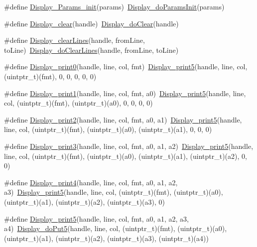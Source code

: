 \begin{DoxyCompactItemize}
\item 
\#define \hyperlink{_display_8h_a4fb2982f52995a80194fbb107883a183}{Display\+\_\+\+Params\+\_\+init}(params)~\hyperlink{_display_8h_aff22833ae1cdccbbde3a57e82f85896c}{Display\+\_\+do\+Params\+Init}(params)
\item 
\#define \hyperlink{_display_8h_ab5a031704e2a1a9525d2c1a92346f842}{Display\+\_\+clear}(handle)~\hyperlink{_display_8h_a68955bb81b0db818bf2688695dca1e4a}{Display\+\_\+do\+Clear}(handle)
\item 
\#define \hyperlink{_display_8h_abae2ae910c2c533dbf11d24c656609d1}{Display\+\_\+clear\+Lines}(handle,  from\+Line,  to\+Line)~\hyperlink{_display_8h_a443fc3167f9ce70bebf9e016443c6383}{Display\+\_\+do\+Clear\+Lines}(handle, from\+Line, to\+Line)
\item 
\#define \hyperlink{_display_8h_acd3685718132aa56f51827b28cab9717}{Display\+\_\+print0}(handle,  line,  col,  fmt)~\hyperlink{_display_8h_a9c5ad419aa15ab0f127aec0e81a4706a}{Display\+\_\+print5}(handle, line, col, (uintptr\+\_\+t)(fmt), 0, 0, 0, 0, 0)
\item 
\#define \hyperlink{_display_8h_a32faeb481b205f15a47fe8a57b15050c}{Display\+\_\+print1}(handle,  line,  col,  fmt,  a0)~\hyperlink{_display_8h_a9c5ad419aa15ab0f127aec0e81a4706a}{Display\+\_\+print5}(handle, line, col, (uintptr\+\_\+t)(fmt), (uintptr\+\_\+t)(a0), 0, 0, 0, 0)
\item 
\#define \hyperlink{_display_8h_a38c04b221312d6810860cc798c5bd87a}{Display\+\_\+print2}(handle,  line,  col,  fmt,  a0,  a1)~\hyperlink{_display_8h_a9c5ad419aa15ab0f127aec0e81a4706a}{Display\+\_\+print5}(handle, line, col, (uintptr\+\_\+t)(fmt), (uintptr\+\_\+t)(a0), (uintptr\+\_\+t)(a1), 0, 0, 0)
\item 
\#define \hyperlink{_display_8h_ac4666e03680fc5c36ba2d186fce9f8f1}{Display\+\_\+print3}(handle,  line,  col,  fmt,  a0,  a1,  a2)~\hyperlink{_display_8h_a9c5ad419aa15ab0f127aec0e81a4706a}{Display\+\_\+print5}(handle, line, col, (uintptr\+\_\+t)(fmt), (uintptr\+\_\+t)(a0), (uintptr\+\_\+t)(a1), (uintptr\+\_\+t)(a2), 0, 0)
\item 
\#define \hyperlink{_display_8h_a346f79ffd49fb4b049812cff58e1c55b}{Display\+\_\+print4}(handle,  line,  col,  fmt,  a0,  a1,  a2,  a3)~\hyperlink{_display_8h_a9c5ad419aa15ab0f127aec0e81a4706a}{Display\+\_\+print5}(handle, line, col, (uintptr\+\_\+t)(fmt), (uintptr\+\_\+t)(a0), (uintptr\+\_\+t)(a1), (uintptr\+\_\+t)(a2), (uintptr\+\_\+t)(a3), 0)
\item 
\#define \hyperlink{_display_8h_a9c5ad419aa15ab0f127aec0e81a4706a}{Display\+\_\+print5}(handle,  line,  col,  fmt,  a0,  a1,  a2,  a3,  a4)~\hyperlink{_display_8h_a1cd0faeb6b7fcd857e4973fb1d79fac3}{Display\+\_\+do\+Put5}(handle, line, col, (uintptr\+\_\+t)(fmt), (uintptr\+\_\+t)(a0), (uintptr\+\_\+t)(a1), (uintptr\+\_\+t)(a2), (uintptr\+\_\+t)(a3), (uintptr\+\_\+t)(a4))

\end{DoxyCompactItemize}
